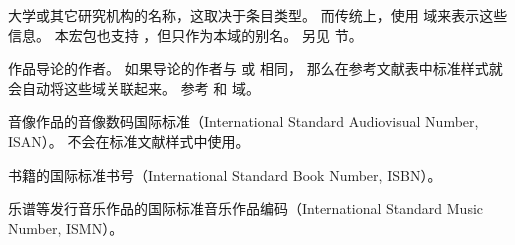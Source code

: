 \begin{fieldlist}



大学或其它研究机构的名称，这取决于条目类型。
而传统上，\BibTeX 使用  域来表示这些信息。
本宏包也支持 ，但只作为本域的别名。
另见  节。




作品导论的作者。
如果导论的作者与  或  相同，
那么在参考文献表中标准样式就会自动将这些域关联起来。
参考  和  域。




音像作品的音像数码国际标准（International Standard Audiovisual Number,  ISAN）。
不会在标准文献样式中使用。




书籍的国际标准书号（International Standard Book Number, ISBN）。




乐谱等发行音乐作品的国际标准音乐作品编码（International Standard Music Number,  ISMN）。



\end{fieldlist}
